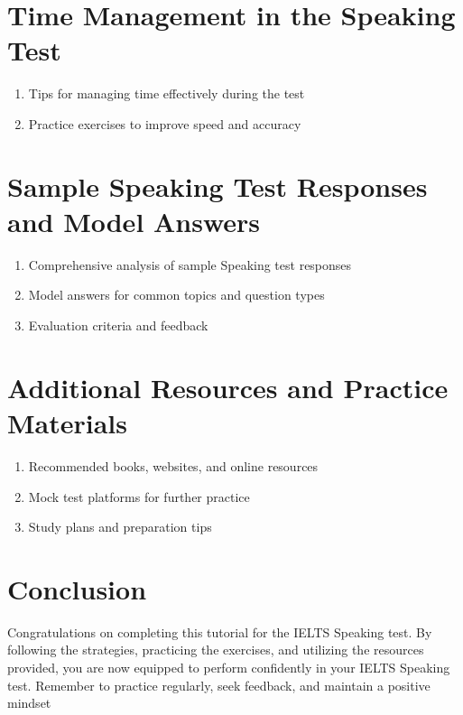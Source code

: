\documentclass{article}
\begin{document}
\section{Time Management in the Speaking Test}
\begin{enumerate}[label=\alph*)]
    \item Tips for managing time effectively during the test
    \item Practice exercises to improve speed and accuracy
\end{enumerate}

\section{Sample Speaking Test Responses and Model Answers}
\begin{enumerate}[label=\alph*)]
    \item Comprehensive analysis of sample Speaking test responses
    \item Model answers for common topics and question types
    \item Evaluation criteria and feedback
\end{enumerate}

\section{Additional Resources and Practice Materials}
\begin{enumerate}[label=\alph*)]
    \item Recommended books, websites, and online resources
    \item Mock test platforms for further practice
    \item Study plans and preparation tips
\end{enumerate}

\section{Conclusion}
Congratulations on completing this tutorial for the IELTS Speaking test. By following the strategies, practicing the exercises, and utilizing the resources provided, you are now equipped to perform confidently in your IELTS Speaking test. Remember to practice regularly, seek feedback, and maintain a positive mindset
\end{document}
